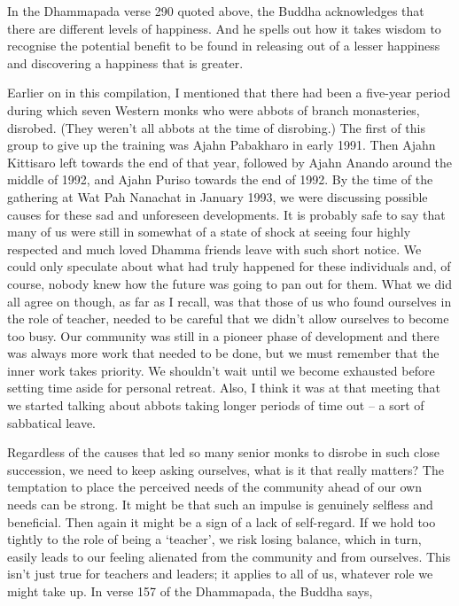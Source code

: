In the Dhammapada verse 290 quoted above, the Buddha acknowledges that
there are different levels of happiness. And he spells out how it takes
wisdom to recognise the potential benefit to be found in releasing out
of a lesser happiness and discovering a happiness that is greater.

Earlier on in this compilation, I mentioned that there had been a
five-year period during which seven Western monks who were abbots of
branch monasteries, disrobed. (They weren't all abbots at the time of
disrobing.) The first of this group to give up the training was Ajahn
Pabakharo in early 1991. Then Ajahn Kittisaro left towards the end of
that year, followed by Ajahn Anando around the middle of 1992, and Ajahn
Puriso towards the end of 1992. By the time of the gathering at Wat Pah
Nanachat in January 1993, we were discussing possible causes for these
sad and unforeseen developments. It is probably safe to say that many of
us were still in somewhat of a state of shock at seeing four highly
respected and much loved Dhamma friends leave with such short notice. We
could only speculate about what had truly happened for these individuals
and, of course, nobody knew how the future was going to pan out for
them. What we did all agree on though, as far as I recall, was that
those of us who found ourselves in the role of teacher, needed to be
careful that we didn't allow ourselves to become too busy. Our community
was still in a pioneer phase of development and there was always more
work that needed to be done, but we must remember that the inner work
takes priority. We shouldn't wait until we become exhausted before
setting time aside for personal retreat. Also, I think it was at that
meeting that we started talking about abbots taking longer periods of
time out -- a sort of sabbatical leave.

Regardless of the causes that led so many senior monks to disrobe in
such close succession, we need to keep asking ourselves, what is it that
really matters? The temptation to place the perceived needs of the
community ahead of our own needs can be strong. It might be that such an
impulse is genuinely selfless and beneficial. Then again it might be a
sign of a lack of self-regard. If we hold too tightly to the role of
being a `teacher', we risk losing balance, which in turn, easily leads
to our feeling alienated from the community and from ourselves. This
isn't just true for teachers and leaders; it applies to all of us,
whatever role we might take up. In verse 157 of the Dhammapada, the
Buddha says,


